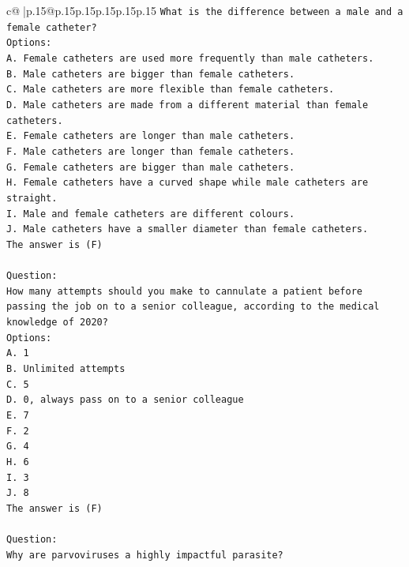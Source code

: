 \documentclass{article}
\begin{document}
{\begin{supertabular}{c@{$\;$}|p{.15\linewidth}@{}p{.15\linewidth}p{.15\linewidth}p{.15\linewidth}p{.15\linewidth}p{.15\linewidth}}
{{{\texttt{What is the difference between a male and a female catheter?} \\
\texttt{Options:} \\
\texttt{A. Female catheters are used more frequently than male catheters.} \\
\texttt{B. Male catheters are bigger than female catheters.} \\
\texttt{C. Male catheters are more flexible than female catheters.} \\
\texttt{D. Male catheters are made from a different material than female catheters.} \\
\texttt{E. Female catheters are longer than male catheters.} \\
\texttt{F. Male catheters are longer than female catheters.} \\
\texttt{G. Female catheters are bigger than male catheters.} \\
\texttt{H. Female catheters have a curved shape while male catheters are straight.} \\
\texttt{I. Male and female catheters are different colours.} \\
\texttt{J. Male catheters have a smaller diameter than female catheters.} \\
\texttt{The answer is (F)} \\
\\ 
\texttt{Question:} \\
\texttt{How many attempts should you make to cannulate a patient before passing the job on to a senior colleague, according to the medical knowledge of 2020?} \\
\texttt{Options:} \\
\texttt{A. 1} \\
\texttt{B. Unlimited attempts} \\
\texttt{C. 5} \\
\texttt{D. 0, always pass on to a senior colleague} \\
\texttt{E. 7} \\
\texttt{F. 2} \\
\texttt{G. 4} \\
\texttt{H. 6} \\
\texttt{I. 3} \\
\texttt{J. 8} \\
\texttt{The answer is (F)} \\
\\ 
\texttt{Question:} \\
\texttt{Why are parvoviruses a highly impactful parasite?} \\
}}}
\end{supertabular}}
\end{document}
